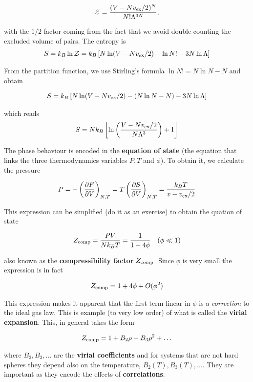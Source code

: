 \documentclass[
  letterpaper,
  enabledeprecatedfontcommands]{report}
\begin{document}
\[\mathcal{Z} = \dfrac{(V-Nv_{\rm ex}/2)^N}{N!\Lambda^{3N}},\]

with the \(1/2\) factor coming from the fact that we avoid double
counting the excluded volume of pairs. The entropy is \[
S = k_B \ln \mathcal{Z} = k_B \left[ N \ln(V - N v_{\rm ex}/2) - \ln N! - 3N \ln \Lambda \right]
\]

From the partition function, we use Stirling's formula
\(\ln N! = N\ln N -N\) and obtain

\[
S = k_B \left[ N \ln(V - N v_{\rm ex}/2) - (N \ln N - N) - 3N \ln \Lambda \right]
\]

which reads \[
S = N k_B \left[ \ln\left( \frac{V - N v_{\rm ex}/2}{N \Lambda^3} \right) + 1 \right]
\]

The phase behaviour is encoded in the \textbf{equation of state} (the
equation that links the three thermodynamics variables \(P,T\) and
\(\phi\)). To obtain it, we calculate the pressure

\[P = -\left(\dfrac{\partial F}{\partial V}\right)_{N,T} =T\left(\dfrac{\partial S}{\partial V}\right)_{N,T}= \dfrac{k_B T }{v-v_{\rm ex}/2}\]

This expression can be simplified (do it as an exercise) to obtain the
quation of state

\[Z_{\rm comp}= \dfrac{PV}{Nk_BT}=\dfrac{1}{1-4\phi} \quad (\phi\ll 1)\]

also known as the \textbf{compressibility factor} \(Z_{\rm comp}\).
Since \(\phi\) is very small the expression is in fact


\[Z_{\rm comp} = 1+4\phi+O(\phi^2)\]

This expression makes it apparent that the first term linear in \(\phi\)
is a \emph{correction} to the ideal gas law. This is example (to very
low order) of what is called the \textbf{virial expansion}. This, in
general takes the form

\[Z_{\rm comp}= 1 + B_2 \rho + B_3 \rho^2+ \dots\]

where \(B_2, B_3, \dots\) are the \textbf{virial coefficients} and for
systems that are not hard spheres they depend also on the temperature,
\(B_2(T), B_3(T),\dots\). They are important as they encode the effects
of \textbf{correlations}:
\end{document}
